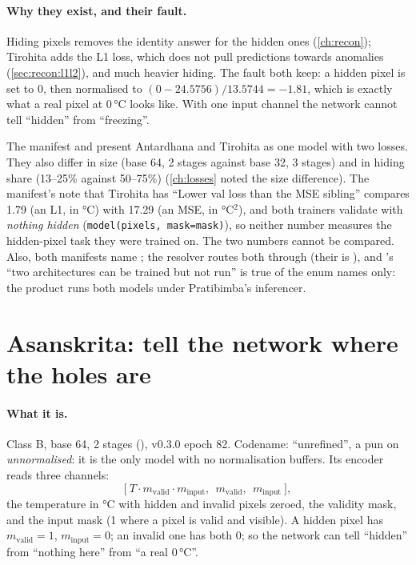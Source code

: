 \paragraph{Why they exist, and their fault.} Hiding pixels removes the identity answer for the hidden ones
(\cref{ch:recon}); Tirohita adds the L1 loss, which does not pull predictions towards anomalies
(\cref{sec:recon:l1l2}), and much heavier hiding. The fault both keep: a hidden pixel is set to 0, then normalised to
$(0-24.5756)/13.5744=-1.81$, which is exactly what a real pixel at 0\,°C looks like. With one input channel the network
cannot tell ``hidden'' from ``freezing''.

\begin{sourcenote}
The manifest and  present Antardhana and Tirohita as one model with two losses.
They also differ in size (base 64, 2 stages against base 32, 3 stages) and in hiding share (13--25\% against 50--75\%)
(\cref{ch:losses} noted the size difference). The manifest's note that Tirohita has ``Lower val loss than the MSE
sibling'' compares 1.79 (an L1, in °C) with 17.29 (an MSE, in °C$^2$), and both trainers validate with
\emph{nothing hidden} (\lstinline!model(pixels, mask=mask)!), so neither number measures the hidden-pixel task they were
trained on. The two numbers cannot be compared. Also, both manifests name ;
the resolver routes both through  (their  is
), and 's ``two architectures can be trained but not run'' is true of
the enum names only: the product runs both models under Pratibimba's inferencer.
\end{sourcenote}

\section{Asanskrita: tell the network where the holes are}\label{sec:convae:asanskrita}

\paragraph{What it is.} Class B, base 64, 2 stages
(), v0.3.0 epoch 82. Codename: ``unrefined'', a pun on
\emph{unnormalised}: it is the only model with no normalisation buffers. Its encoder reads three channels:
\begin{equation}\label{eq:convae:three}
\big[\ T\cdot m_\text{valid}\cdot m_\text{input},\ \ m_\text{valid},\ \ m_\text{input}\ \big],
\end{equation}
the temperature in °C with hidden and invalid pixels zeroed, the validity mask, and the input mask (1 where a
pixel is valid and visible). A hidden pixel has $m_\text{valid}=1$, $m_\text{input}=0$; an invalid one has both 0; so
the network can tell ``hidden'' from ``nothing here'' from ``a real 0\,°C''.

